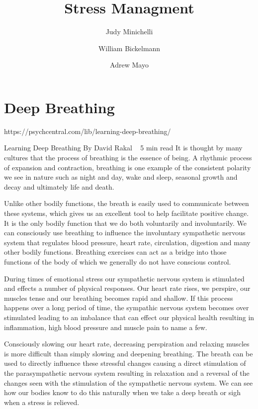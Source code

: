 \documentclass{book}\usepackage[]{graphicx}\usepackage[]{color}
\begin{document}
\title{Stress Managment}
\date{}
\author{Judy Minichelli \and William Bickelmann \and Adrew Mayo}
\maketitle

\tableofcontents


\chapter{Deep Breathing}

https://psychcentral.com/lib/learning-deep-breathing/

Learning Deep Breathing By David Rakal
~ 5 min read
It is thought by many cultures that the process of breathing is the essence of being. A rhythmic process of expansion and contraction, breathing is one example of the consistent polarity we see in nature such as night and day, wake and sleep, seasonal growth and decay and ultimately life and death.

Unlike other bodily functions, the breath is easily used to communicate between these systems, which gives us an excellent tool to help facilitate positive change. It is the only bodily function that we do both voluntarily and involuntarily. We can consciously use breathing to influence the involuntary sympathetic nervous system that regulates blood pressure, heart rate, circulation, digestion and many other bodily functions. Breathing exercises can act as a bridge into those functions of the body of which we generally do not have conscious control.

During times of emotional stress our sympathetic nervous system is stimulated and effects a number of physical responses. Our heart rate rises, we perspire, our muscles tense and our breathing becomes rapid and shallow. If this process happens over a long period of time, the sympathic nervous system becomes over stimulated leading to an imbalance that can effect our physical health resulting in inflammation, high blood pressure and muscle pain to name a few.

Consciously slowing our heart rate, decreasing perspiration and relaxing muscles is more difficult than simply slowing and deepening breathing. The breath can be used to directly influence these stressful changes causing a direct stimulation of the parasympathetic nervous system resulting in relaxation and a reversal of the changes seen with the stimulation of the sympathetic nervous system. We can see how our bodies know to do this naturally when we take a deep breath or sigh when a stress is relieved.
\end{document}
